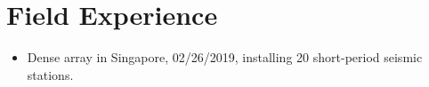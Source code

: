 \section*{Field Experience}
\begin{itemize}
\item Dense array in Singapore,
      02/26/2019, installing 20 short-period seismic stations.
\end{itemize}
